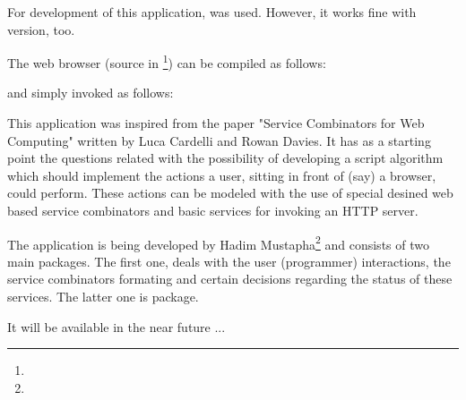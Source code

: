 \documentclass{ozdoc}
\begin{document}
For development of this application,  was used. However, it works fine with  version, too. \mozartEMPTY


The web browser (source in \footnote{}) can be compiled as follows: \mozartEMPTY
\begin{mozartCODEDISPLAY}\mozartFACEKEYWORD{-}\end{mozartCODEDISPLAY}


and simply invoked as follows: \mozartEMPTY
\begin{mozartCODEDISPLAY}\end{mozartCODEDISPLAY}





This application was inspired from the paper "Service Combinators for Web Computing" written by Luca Cardelli and Rowan Davies. It has as a starting point the questions related with the possibility of developing a script algorithm which should implement the actions a user, sitting in front of (say) a browser, could perform. These actions can be modeled with the use of special desined web based service combinators and basic services for invoking an HTTP server. 

The application is being developed by Hadim Mustapha\footnote{} and consists of two main packages. The first one, deals with the user (programmer) interactions, the service combinators formating and certain decisions regarding the status of these services. The latter one is  package.  \mozartEMPTY


It will be available in the near future ... \mozartEMPTY
 \mozartEMPTY
  
\end{document}

